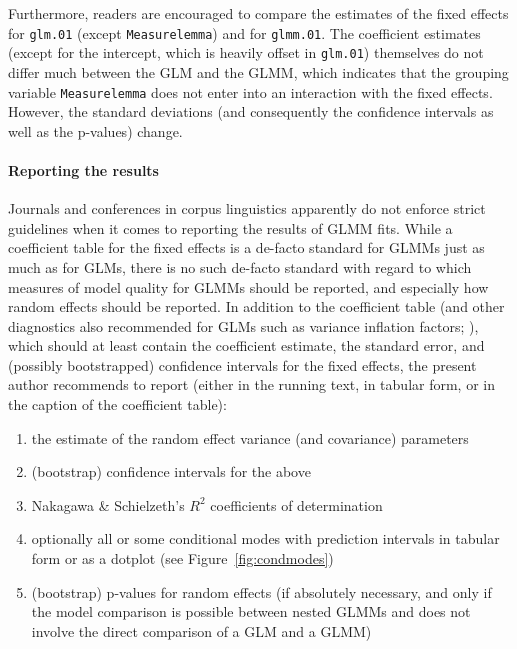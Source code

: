 Furthermore, readers are encouraged to compare the estimates of the fixed effects for \texttt{glm.01} (except \texttt{Measurelemma}) and for \texttt{glmm.01}.
The coefficient estimates (except for the intercept, which is heavily offset in \texttt{glm.01}) themselves do not differ much between the GLM and the GLMM, which indicates that the grouping variable \texttt{Measurelemma} does not enter into an interaction with the fixed effects.
However, the standard deviations (and consequently the confidence intervals as well as the p-values) change.

\paragraph{Reporting the results}

Journals and conferences in corpus linguistics apparently do not enforce strict guidelines when it comes to reporting the results of GLMM fits.
While a coefficient table for the fixed effects is a de-facto standard for GLMMs just as much as for GLMs, there is no such de-facto standard with regard to which measures of model quality for GLMMs should be reported, and especially how random effects should be reported.
In addition to the coefficient table (and other diagnostics also recommended for GLMs such as variance inflation factors; \citealp{FoxMonette1992,ZuurEa2010}), which should at least contain the coefficient estimate, the standard error, and (possibly bootstrapped) confidence intervals for the fixed effects, the present author recommends to report (either in the running text, in tabular form, or in the caption of the coefficient table):

\begin{enumerate}
  \item the estimate of the random effect variance (and covariance) parameters
  \item (bootstrap) confidence intervals for the above
  \item Nakagawa \& Schielzeth's $R^2$ coefficients of determination
  \item optionally all or some conditional modes with prediction intervals in tabular form or as a dotplot (see Figure~\ref{fig:condmodes})
  \item (bootstrap) p-values for random effects (if absolutely necessary, and only if the model comparison is possible between nested GLMMs and does not involve the direct comparison of a GLM and a GLMM)
\end{enumerate}

